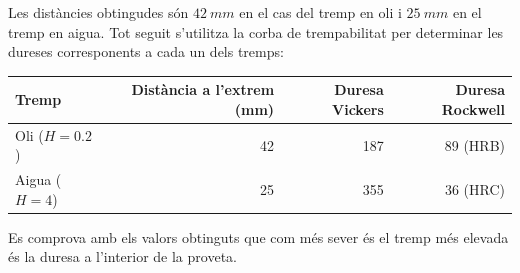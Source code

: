 \documentclass[a4paper]{report}
\begin{document}
Les distàncies obtingudes són $42\ mm$ en el cas del tremp en oli i $25\ mm$ en el tremp en aigua. Tot seguit s'utilitza la corba de trempabilitat per determinar les dureses corresponents a cada un dels tremps:

\begin{table}[H]
	\centering
	\begin{tabular}{|l|rrr|}
		\hline
		Tremp & Distància a l'extrem (mm) & Duresa Vickers & Duresa Rockwell \\
		\hline
		Oli ($H=0.2$) & 42 & 187 & 89 (HRB) \\
		Aigua ($H=4$) & 25 & 355 & 36 (HRC) \\
		\hline
	\end{tabular}
\end{table}

Es comprova amb els valors obtinguts que com més sever és el tremp més elevada és la duresa a l'interior de la proveta.
\end{document}
